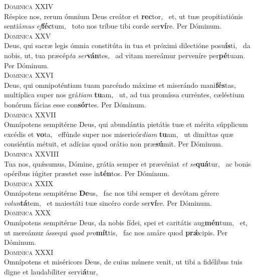 \begin{translatioMulticol}{2}
{\color{red}\textsc{Dominica XXIV}}\\
Réspice nos, rerum ómnium Deus creátor et \textbf{rec}tor,~\gredagger{}
et, ut tuæ propitiatiónis sentiá\textit{mus} \textit{ef}\textbf{féc}tum,~\grestar{}
toto nos tríbue tibi corde ser\textbf{ví}re. Per Dóminum.\\
{\color{red}\textsc{Dominica XXV}}\\
Deus, qui sacræ legis ómnia constitúta in tua et próximi dilectióne posu\textbf{ís}ti,~\gredagger{}
da nobis, ut, tua præcép\textit{ta} \textit{ser}\textbf{ván}tes,~\grestar{}
ad vitam mereámur perveníre per\textbf{pé}tuam. Per Dóminum.\\
{\color{red}\textsc{Dominica XXVI}}\\
Deus, qui omnipoténtiam tuam parcéndo máxime et miserándo mani\textbf{fés}tas,~\gredagger{}
multíplica super nos grá\textit{ti}\textit{am} \textbf{tu}am,~\grestar{}
ut, ad tua promíssa curréntes, cæléstium bonórum fácias esse con\textbf{sór}tes. Per Dóminum.\\
{\color{red}\textsc{Dominica XXVII}}\\
Omnípotens sempitérne Deus, qui abundántia pietátis tuæ et mérita súpplicum excédis et \textbf{vo}ta,~\gredagger{}
effúnde super nos misericór\textit{di}\textit{am} \textbf{tu}am,~\grestar{}
ut dimíttas quæ consiéntia métuit, et adícias quod orátio non præ\textbf{sú}mit. Per Dóminum.\\
{\color{red}\textsc{Dominica XXVIII}}\\
Tua nos, quǽsumus, Dómine, grátia semper et prævéniat \textit{et} \textit{se}\textbf{quá}tur,~\grestar{}
ac bonis opéribus iúgiter præstet esse in\textbf{tén}tos. Per Dóminum.\\
{\color{red}\textsc{Dominica XXIX}}\\
Omnípotens sempitérne \textbf{De}us,~\gredagger{}
fac nos tibi semper et devótam gérere \textit{vo}\textit{lun}\textbf{tá}tem,~\grestar{}
et maiestáti tuæ sincéro corde ser\textbf{ví}re. Per Dóminum.\\
{\color{red}\textsc{Dominica XXX}}\\
Omnípotens sempitérne Deus, da nobis fídei, spei et caritátis aug\textbf{mén}tum,~\gredagger{}
et, ut mereámur ássequi \textit{quod} \textit{pro}\textbf{mít}tis,~\grestar{}
fac nos amáre quod \textbf{prǽ}cipis. Per Dóminum.\\
{\color{red}\textsc{Dominica XXXI}}\\
Omnípotens et miséricors Deus, de cuius múnere venit, ut tibi a fidélibus tuis digne et laudabíliter servi\textbf{á}tur,~\gredagger{}

\end{translatioMulticol}
